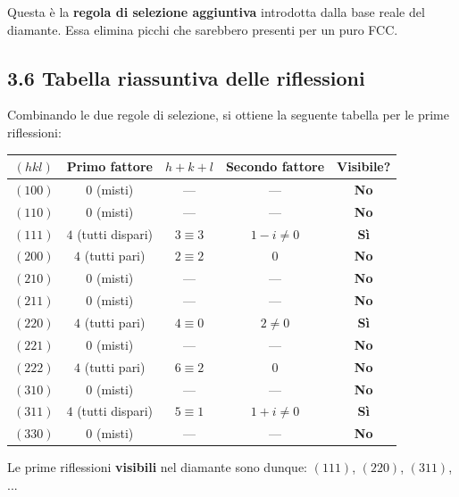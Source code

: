 Questa è la \textbf{regola di selezione aggiuntiva} introdotta dalla base reale del diamante. Essa elimina picchi che sarebbero presenti per un puro FCC.

\subsection*{3.6 Tabella riassuntiva delle riflessioni}

Combinando le due regole di selezione, si ottiene la seguente tabella per le prime riflessioni:

\begin{table}[h!]
\centering
\renewcommand{\arraystretch}{1.2}
\begin{tabular}{|c|c|c|c|c|}
\hline
\textbf{$(hkl)$} & \textbf{Primo fattore} & \textbf{$h+k+l$} & \textbf{Secondo fattore} & \textbf{Visibile?} \\ \hline
$(100)$ & $0$ (misti) & --- & --- & \textbf{No} \\ \hline
$(110)$ & $0$ (misti) & --- & --- & \textbf{No} \\ \hline
$(111)$ & $4$ (tutti dispari) & $3 \equiv 3$ & $1-i \neq 0$ & \textbf{Sì} \\ \hline
$(200)$ & $4$ (tutti pari) & $2 \equiv 2$ & $0$ & \textbf{No} \\ \hline
$(210)$ & $0$ (misti) & --- & --- & \textbf{No} \\ \hline
$(211)$ & $0$ (misti) & --- & --- & \textbf{No} \\ \hline
$(220)$ & $4$ (tutti pari) & $4 \equiv 0$ & $2 \neq 0$ & \textbf{Sì} \\ \hline
$(221)$ & $0$ (misti) & --- & --- & \textbf{No} \\ \hline
$(222)$ & $4$ (tutti pari) & $6 \equiv 2$ & $0$ & \textbf{No} \\ \hline
$(310)$ & $0$ (misti) & --- & --- & \textbf{No} \\ \hline
$(311)$ & $4$ (tutti dispari) & $5 \equiv 1$ & $1+i \neq 0$ & \textbf{Sì} \\ \hline
$(330)$ & $0$ (misti) & --- & --- & \textbf{No} \\ \hline
\end{tabular}
\end{table}

Le prime riflessioni \textbf{visibili} nel diamante sono dunque: $(111)$, $(220)$, $(311)$, ...

